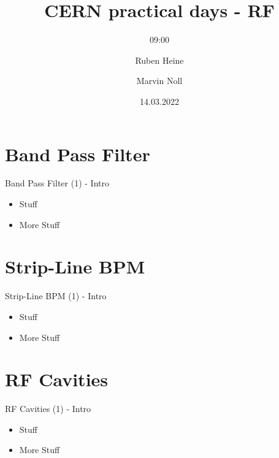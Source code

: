 \documentclass{beamer}
\title[Practical Days - RF]{CERN practical days - RF}
\subtitle{09:00}
\author[Heine, Noll]{Ruben Heine \and Marvin Noll}
\date[\today]{14.03.2022}
\begin{document}
\begin{frame}[plain]
  \titlepage
\end{frame}

\section{Band Pass Filter}
\begin{frame}[t,fragile]{Band Pass Filter (1) - Intro}
\begin{itemize}
\item Stuff
\item More Stuff
\end{itemize}
\end{frame}

\section{Strip-Line BPM}
\begin{frame}[t,fragile]{Strip-Line BPM (1) - Intro}
\begin{itemize}
\item Stuff
\item More Stuff
\end{itemize}
\end{frame}

\section{RF Cavities}
\begin{frame}[t,fragile]{RF Cavities (1) - Intro}
\begin{itemize}
\item Stuff
\item More Stuff
\end{itemize}
\end{frame}
\end{document}
